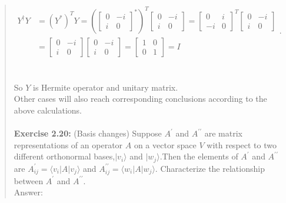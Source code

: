 \documentclass[UTF8]{ctexart}
\begin{document}
\begin{quote}
	$\begin{aligned} Y^{\dagger} Y &=\left(Y^{*}\right)^{T} Y=\left(\left[\begin{array}{cc}{0} & {-i} \\ {i} & {0}\end{array}	\right]^{*}\right)^{T}\left[\begin{array}{cc}{0} & {-i} \\ {i} & {0}\end{array}\right]=\left[\begin{array}{cc}{0} & {i} \\ {-i} & {0}\end{array}\right]^{T}\left[\begin{array}{cc}{0} & {-i} \\ {i} & {0}\end{array}\right] \\ &=\left[\begin{array}{cc}{0} & {-i} \\ {i} & 	{0}\end{array}\right]\left[\begin{array}{cc}{0} & {-i} \\ {i} & {0}\end{array}\right]=\left[\begin{array}{cc}{1} & {0} \\ {0} & 	{1}\end{array}\right]=I \end{aligned}.$\\ 
	\\ \\
	So $ Y$ is Hermite operator and unitary matrix. 
	\\
	Other cases will also reach corresponding conclusions according to the above calculations. 
	\\ \\
\textbf{Exercise 2.20:} (Basis changes) Suppose $A^{\prime}$ and  $A^{\prime\prime}$ are matrix representations of an
operator $A$ on a vector space $V$ with respect to two different orthonormal bases,$| v_{i}\rangle$ and $| w_{j}\rangle$.Then the elements of $A^{\prime}$  and $A^{\prime\prime}$ are $A_{i j}^{\prime}=\langle v_{i}|A| v_{j}\rangle$ and $A_{i j}^{\prime \prime}=\langle w_{i}|A| w_{j}\rangle$. Characterize the relationship between $A^{\prime}$ and  $A^{\prime\prime}$. \\
Answer: \\ \hspace*{0.6cm}

\end{quote}
\end{document}
